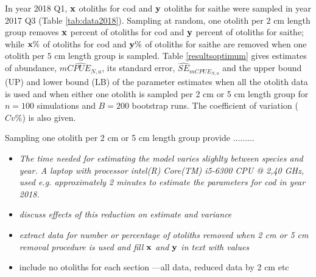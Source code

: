 \documentclass[a4paper 12pt]{article}
\numberwithin{equation}{section}
\begin{document}
In year 2018 Q1, ${\bf x}$ otoliths for cod and ${\bf y}$ otoliths for saithe were sampled in year 2017 Q3 (Table \ref{tab:data2018}). Sampling at random, one otolith per $2$ cm length group removes ${\bf x}$ percent of otoliths for cod and ${\bf y}$ percent of otoliths for saithe; while ${\bf x \%}$ of otoliths  for cod and ${\bf y \%}$  of otoliths for saithe are removed when one otolith per $5$ cm length group is sampled. Table \ref{resultsoptimum} gives estimates of abundance, $\widehat{mCPUE_{N,a}}$, its standard error, $\widehat{SE}_{mCPUE_{N,a}}$ and the upper bound (UP) and lower bound (LB) of the parameter estimates when all the otolith data is used and when either one otolith is sampled per 2 cm or 5 cm length group for  $n = 100$ simulations and $B = 200$ bootstrap runs. The coefficient of variation ($Cv \%$) is also given.

Sampling one otolith per 2 cm or 5 cm length group provide .........

\begin{itemize}
\item \emph{The time needed for estimating the model varies slighlty between species and year. A laptop with  processor intel(R) Core(TM) i5-6300 CPU @ 2,40 GHz, used e.g. approximately 2 minutes to estimate the parameters for cod in year 2018.}
\item \emph{discuss effects of this reduction on estimate and variance}
\item \emph{extract data for number or percentage of otoliths removed when 2 cm or 5 cm removal procedure is used and fill ${\bf x}$  and ${\bf y}$ in text with values }
\item include no otoliths for each section ---all data, reduced data by 2 cm etc
\end{itemize}
\end{document}
